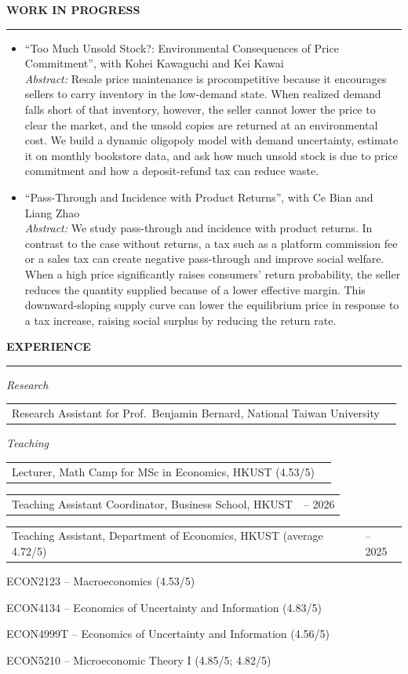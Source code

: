 \documentclass[11pt,letterpaper]{article}
\makeatletter
\newlength{\cvdatecol}
\newcommand{\sectionheader}[1]{%
  \vspace{0.55em}
  {\large\bfseries #1}\\[-0.15em]
  \rule{\textwidth}{0.4pt}\par
  \vspace{0.25em}
}
\newcommand{\cvline}[3][0em]{%
  \par\nobreak
  \noindent\hspace*{#1}%
  \begin{tabularx}{\dimexpr\textwidth-#1\relax}{@{}X@{\hspace{0.75em}}>{\raggedleft\arraybackslash}p{\cvdatecol}@{}}
  #2 & #3 \\
  \end{tabularx}%
}
\newcommand{\courseline}[1]{%
  \par\addvspace{0.28em}%
  \noindent\hspace*{3.2em}#1\par
}
\makeatother
\begin{document}
\sectionheader{WORK IN PROGRESS}
\begin{itemize}
  \item ``Too Much Unsold Stock?: Environmental Consequences of Price Commitment'', with Kohei Kawaguchi and Kei Kawai\\[0.2em]
  \textit{Abstract:} Resale price maintenance is procompetitive because it encourages sellers to carry inventory in the low-demand state. When realized demand falls short of that inventory, however, the seller cannot lower the price to clear the market, and the unsold copies are returned at an environmental cost. We build a dynamic oligopoly model with demand uncertainty, estimate it on monthly bookstore data, and ask how much unsold stock is due to price commitment and how a deposit-refund tax can reduce waste.
  \item ``Pass-Through and Incidence with Product Returns'', with Ce Bian and Liang Zhao\\[0.2em]
  \textit{Abstract:} We study pass-through and incidence with product returns. In contrast to the case without returns, a tax such as a platform commission fee or a sales tax can create negative pass-through and improve social welfare. When a high price significantly raises consumers' return probability, the seller reduces the quantity supplied because of a lower effective margin. This downward-sloping supply curve can lower the equilibrium price in response to a tax increase, raising social surplus by reducing the return rate.
\end{itemize}

\sectionheader{EXPERIENCE}
{
\textit{Research}\\[-0.5em]
\cvline[1.5em]{Research Assistant for Prof.\ Benjamin Bernard, National Taiwan University}{2020}

\vspace{-0.1em}
\textit{Teaching}\\[-0.5em]
\cvline[1.5em]{Lecturer, Math Camp for MSc in Economics, HKUST (4.53/5)}{2026}
\vspace{-0.12em}
\cvline[1.5em]{Teaching Assistant Coordinator, Business School, HKUST}{2025 -- 2026}
\vspace{-0.12em}
\cvline[1.5em]{Teaching Assistant, Department of Economics, HKUST (average 4.72/5)}{2020 -- 2025}
\vspace{0.1em}
\courseline{ECON2123 -- Macroeconomics (4.53/5)}
\courseline{ECON4134 -- Economics of Uncertainty and Information (4.83/5)}
\courseline{ECON4999T -- Economics of Uncertainty and Information (4.56/5)}
\courseline{ECON5210 -- Microeconomic Theory I (4.85/5; 4.82/5)}

}
\end{document}
